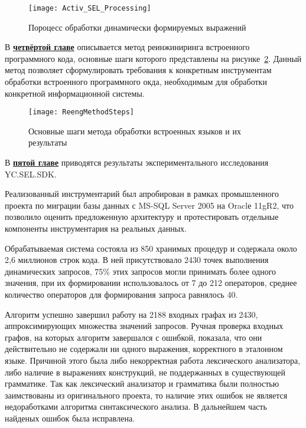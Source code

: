 \begin{figure}[]
  \centering
 \texttt{[image: Activ\_SEL\_Processing]}
 \caption{Пороцесс обработки динамически формируемых выражений}
 \label{sel_processing}
\end{figure}


В \underline{\textbf{четвёртой главе}} описывается метод реинжиниринга встроенного программного кода, основные шаги которого представлены на рисунке~\ref{fig:method}. Данный метод позволяет сформулировать требования к конкретным инструментам обработки встроенного программного окда, необходимым для обработки конкретной информационной системы.

\begin{figure}[]
\begin{center}
\texttt{[image: ReengMethodSteps]}
\caption{Основные шаги метода обработки встроенных языков и их результаты}
\label{fig:method} 
\end{center}
\end{figure}


В \underline{\textbf{пятой главе}} приводятся результаты экспериментального исследования YC.SEL.SDK.

Реализованный инструментарий был апробирован в рамках промышленного проекта по миграции базы данных с MS-SQL Server 2005 на Oraclе 11gR2, что позволило оценить предложенную архитектуру и протестировать отдельные компоненты инструментария на реальных данных.

Обрабатываемая система состояла из 850 хранимых процедур и содержала около 2,6 миллионов строк кода. В ней присутствовало 2430 точек выполнения динамических запросов, 75\% этих запросов могли принимать 
более одного значения, при их формировании использовалось от 7 до 212 операторов, среднее количество операторов для формирования запроса равнялось 40.

Алгоритм успешно завершил работу на 2188 входных графах из 2430, аппроксимирующих множества значений запросов. Ручная проверка входных графов, на которых алгоритм завершался с ошибкой, показала, что они действительно не содержали ни одного выражения, корректного в эталонном языке. Причиной этого была либо некорректная работа лексического анализатора, либо наличие в выражениях конструкций, не поддержанных в существующей грамматике. Так как лексический анализатор и грамматика были полностью заимствованы из оригинального проекта, то наличие этих ошибок не является недоработками алгоритма синтаксического анализа. В дальнейшем часть найденых ошибок была исправлена.

